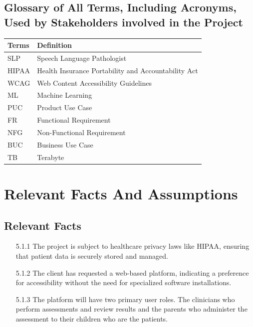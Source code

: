 \documentclass[12pt]{article}
\begin{document}
\subsection{Glossary of All Terms, Including Acronyms, Used by Stakeholders
involved in the Project}

\begin{tabularx}{\textwidth}{p{2cm}X}
  \toprule {\textbf{Terms}} & {\textbf{Definition}}\\
  \midrule
  SLP & Speech Language Pathologist\\
  HIPAA & Health Insurance Portability and Accountability Act\\
  WCAG & Web Content Accessibility Guidelines\\
  ML & Machine Learning\\
  PUC & Product Use Case\\
  FR & Functional Requirement\\
  NFG & Non-Functional Requirement\\
  BUC & Business Use Case\\
  TB & Terabyte\\
  \bottomrule
\end{tabularx}

\section{Relevant Facts And Assumptions}
\subsection{Relevant Facts}
\begin{itemize}
  \item[5.1.1] The project is subject to healthcare privacy laws like HIPAA, ensuring that patient data is securely stored and managed.
  \item[5.1.2] The client has requested a web-based platform, indicating a preference for accessibility without the need for specialized 
  software installations.
  \item[5.1.3] The platform will have two primary user roles. The clinicians who perform assessments and review results and the parents who 
  administer the assessment to their children who are the patients.
\end{itemize}
\end{document}
